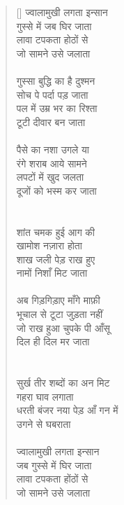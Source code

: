 \begin{verse}[\versewidth]\texthindi{
ज्वालामुखी लगता इन्सान\\
 गुस्से में जब घिर जाता\\
लावा टपकता होठों से\\
जो सामने उसे जलाता\\
\\
गुस्सा बुद्धि का है दुश्मन\\
सोच पे पर्दा पड़ जाता\\
पल में उम्र भर का रिश्ता\\
टूटी दीवार बन जाता\\
\\
पैसे का नशा उगले या\\
रंगे शराब आये सामने\\
लपटों में खुद जलता\\
दूजों को भस्म कर जाता\\
\\
\\
शांत चमक हुई आग की\\
खामोश नज़ारा होता\\
शाख जली पेड़ राख हुए \\
नामों निशाँ मिट जाता\\
\\
अब गिड़गिड़ाए माँगे माफ़ी\\
भूचाल से टूटा जुड़ता नहीं\\
जो राख हुआ चुपके पी आँसू\\
दिल ही दिल मर जाता\\
\\
\\
सुर्ख तीर शब्दों का अन मिट\\
गहरा घाव लगाता\\
धरती बंजर नया पेड़ आँ गन में\\
उगने से घबराता\\
\\
ज्वालामुखी लगता इन्सान\\
जब गुस्से में घिर जाता\\
लावा टपकता होंठों से\\
जो सामने उसे जलाता
}\end{verse}

